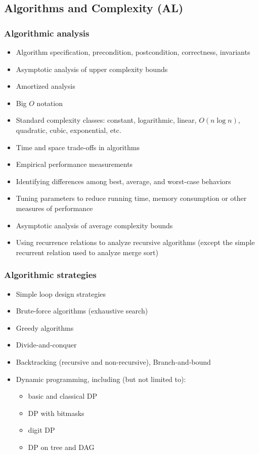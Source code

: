 \documentclass[12pt]{article}
\begin{document}
	\subsection{Algorithms and Complexity (AL)}
		\renewcommand{\type}{AL}
		\subsubsection{Algorithmic analysis}
		\begin{itemize}[label=]
			\item Algorithm specification, precondition, postcondition, correctness, invariants
			\item Asymptotic analysis of upper complexity bounds
			\item Amortized analysis
			\item Big $O$ notation
			\item Standard complexity classes: constant, logarithmic, linear, $O(n\log{n})$, quadratic, cubic, exponential, etc.
			\item Time and space trade-offs in algorithms
			\item Empirical performance measurements
			\item Identifying differences among best, average, and worst-case behaviors
			\item Tuning parameters to reduce running time, memory consumption or other measures of performance
		\end{itemize}
		
		\begin{itemize}[label=]
			\item Asymptotic analysis of average complexity bounds
			\item Using recurrence relations to analyze recursive algorithms (except the simple recurrent relation used to analyze merge sort)
		\end{itemize}
			
		\subsubsection{Algorithmic strategies}
		\begin{itemize}[label=]
			\item Simple loop design strategies
			\item Brute-force algorithms (exhaustive search)
			\item Greedy algorithms
			\item Divide-and-conquer
			\item Backtracking (recursive and non-recursive), Branch-and-bound
			\item Dynamic programming, including (but not limited to):
				\begin{itemize}[label=$\bullet$,leftmargin=12pt,topsep=-\parskip]
					\item basic and classical DP
					\item DP with bitmasks
					\item digit DP
					\item DP on tree and DAG
				\end{itemize}
		\end{itemize}
	
\end{document}
